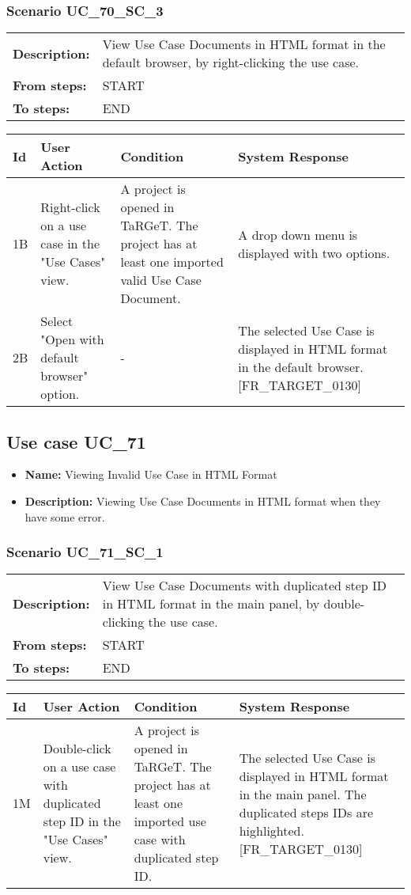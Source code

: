 \documentclass[a4paper,11pt]{article}
\newcommand{\bl}{\\ \hline}
\begin{document}
\subsubsection*{Scenario UC_70_SC_3}
\begin{tabular}{p{1in}p{4in}}
{\bf Description:} & View Use Case Documents in HTML format in the default browser, by right-clicking the use case. \\
{\bf From steps:} & START \\
{\bf To steps:} & END \\
\end{tabular}
 
\begin{tabular}{|p{0.8in}|p{1.6in}|p{1.6in}|p{1.6in}|}
\hline
Id & User Action & Condition & System Response  \bl 
1B & Right-click on a use case in the "Use Cases" view. & A project is opened in TaRGeT. The project has at least one imported valid Use Case Document. & A drop down menu is displayed with two options. \bl 
2B & Select "Open with default browser" option. & - & The selected Use Case is displayed in HTML format in the default browser. [FR_TARGET_0130] \bl 
\end{tabular}
\subsection*{Use case UC_71}
\begin{itemize}
\item {\bf Name: }Viewing Invalid Use Case in HTML Format
\item {\bf Description: }Viewing Use Case Documents in HTML format when they have some error.
\end{itemize}
\subsubsection*{Scenario UC_71_SC_1}
\begin{tabular}{p{1in}p{4in}}
{\bf Description:} & View Use Case Documents with duplicated step ID in HTML format in the main panel, by double-clicking the use case. \\
{\bf From steps:} & START \\
{\bf To steps:} & END \\
\end{tabular}
 
\begin{tabular}{|p{0.8in}|p{1.6in}|p{1.6in}|p{1.6in}|}
\hline
Id & User Action & Condition & System Response  \bl 
1M & Double-click on a use case with duplicated step ID in the "Use Cases" view. & A project is opened in TaRGeT. The project has at least one imported use case with duplicated step ID. & The selected Use Case is displayed in HTML format in the main panel. The duplicated steps IDs are highlighted.   [FR_TARGET_0130] \bl 
\end{tabular}
\end{document}
